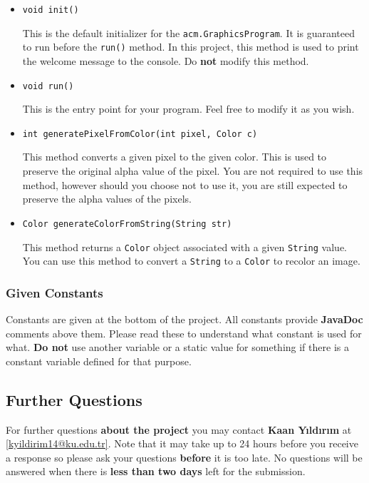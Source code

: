\documentclass[a4paper]{article}
\makeatletter
\newcommand{\contactName}{Kaan Yıldırım}
\newcommand{\contactMail}{kyildirim14@ku.edu.tr}
\makeatother
\begin{document}
	\begin{itemize}

		\item \lstinline{void init()}
		
		This is the default initializer for the \lstinline{acm.GraphicsProgram}. It is guaranteed to run before the \lstinline{run()} method. In this project, this method is used to print the welcome message to the console. Do \textbf{not} modify this method.
		
		\item \lstinline{void run()}
		
		This is the entry point for your program. Feel free to modify it as you wish.
		
		\item \lstinline{int generatePixelFromColor(int pixel, Color c)} 
		
		This method converts a given pixel to the given color. This is used to preserve the original alpha value of the pixel. You are not required to use this method, however should you choose not to use it, you are still expected to preserve the alpha values of the pixels.
		
		\item \lstinline{Color generateColorFromString(String str)} 
		
		This method returns a \lstinline{Color} object associated with a given \lstinline{String} value. You can use this method to convert a \lstinline{String} to a \lstinline{Color} to recolor an image.
		
		
	\end{itemize}
	
	\subsubsection{Given Constants}
	Constants are given at the bottom of the project. All constants provide \textbf{JavaDoc} comments above them. Please read these to understand what constant is used for what. \textbf{Do not} use another variable or a static value for something if there is a constant variable defined for that purpose.
	
	\subsection{Further Questions}
	For further questions \textbf{about the project} you may contact \textbf{\contactName} at \href{mailto:\contactMail}{\mbox{[\contactMail]}}. Note that it may take up to 24 hours before you receive a response so please ask your questions \textbf{before} it is too late. No questions will be answered when there is \textbf{less than two days} left for the submission.
	
\end{document}
